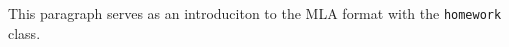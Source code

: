 \documentclass[mla, bib]{homework}
\date{\today}
\begin{document}
	This paragraph serves as an introduciton to the MLA \autocite{foxtest} format with the \texttt{homework} class. \autocite{fox2013}
    \kant
\end{document}
